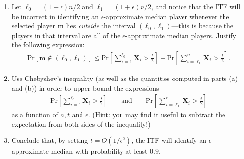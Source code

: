 \documentclass[twoside,11pt]{article}
\renewcommand{\Pr}[1]{{\mathrm{Pr}\mathopen{}\left[ #1 \right]\mathclose{}}}
\newcommand{\bm}{\boldsymbol{m}}
\newcommand{\bX}{\boldsymbol{X}}
\begin{document}
\begin{enumerate}
\begin{enumerate}
\item[(d)] Let $\ell_0 = (1-\epsilon) n /2$ and $\ell_1 = (1+\epsilon) n/2$, and notice that the ITF will be incorrect in identifying an $\epsilon$-approximate median player whenever the selected player $\bm$ lies \emph{outside} the interval $(\ell_0, \ell_1)$---this is because the players in that interval are all of the $\epsilon$-approximate median players. Justify the following expression:
\begin{align*}
\Pr{\bm \notin (\ell_0, \ell_1)} \leq \Pr{ \sum_{i=1}^{\ell_0}  \bX_i > \frac{t}{2} } + \Pr{ \sum_{i=\ell_1}^{n} \bX_i > \frac{t}{2} }.
\end{align*} 

\item[(e)] Use Chebyshev's inequality (as well as the quantities computed in parts (a) and (b)) in order to upper bound the expressions
\begin{align*}
\Pr{\sum_{i=1}^{\ell_0} \bX_i > \frac{t}{2} } \qquad\text{and}\qquad \Pr{\sum_{i=\ell_1}^n \bX_i > \frac{t}{2}}
\end{align*}
as a function of $n, t$ and $\epsilon$. (Hint: you may find it useful to subtract the expectation from both sides of the inequality!)

\item[(f)] Conclude that, by setting $t = O(1/\epsilon^2)$, the ITF will identify an $\epsilon$-approximate median with probability at least $0.9$.

\end{enumerate}

\end{enumerate}
\end{document}
